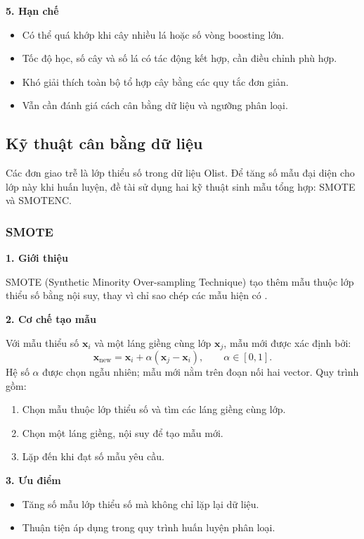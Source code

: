 \documentclass[a4paper]{article}
\begin{document}
\noindent\textbf{5. Hạn chế}\par
\begin{itemize}
    \item Có thể quá khớp khi cây nhiều lá hoặc số vòng boosting lớn.
    \item Tốc độ học, số cây và số lá có tác động kết hợp, cần điều chỉnh phù hợp.
    \item Khó giải thích toàn bộ tổ hợp cây bằng các quy tắc đơn giản.
    \item Vẫn cần đánh giá cách cân bằng dữ liệu và ngưỡng phân loại.
\end{itemize}



\subsection{Kỹ thuật cân bằng dữ liệu}
Các đơn giao trễ là lớp thiểu số trong dữ liệu Olist. Để tăng số mẫu đại diện cho lớp này khi huấn luyện, đề tài sử dụng hai kỹ thuật sinh mẫu tổng hợp: SMOTE và SMOTENC.

\subsubsection{SMOTE}
\noindent\textbf{1. Giới thiệu}\par
SMOTE (Synthetic Minority Over-sampling Technique) tạo thêm mẫu thuộc lớp thiểu số bằng nội suy, thay vì chỉ sao chép các mẫu hiện có \cite{smoteTheory}.

\noindent\textbf{2. Cơ chế tạo mẫu}\par
Với mẫu thiểu số $\mathbf{x}_i$ và một láng giềng cùng lớp $\mathbf{x}_j$, mẫu mới được xác định bởi:
\[
\mathbf{x}_{\mathrm{new}}=\mathbf{x}_i+\alpha(\mathbf{x}_j-\mathbf{x}_i),
\qquad \alpha\in[0,1].
\]
Hệ số $\alpha$ được chọn ngẫu nhiên; mẫu mới nằm trên đoạn nối hai vector. Quy trình gồm:
\begin{enumerate}
    \item Chọn mẫu thuộc lớp thiểu số và tìm các láng giềng cùng lớp.
    \item Chọn một láng giềng, nội suy để tạo mẫu mới.
    \item Lặp đến khi đạt số mẫu yêu cầu.
\end{enumerate}

\noindent\textbf{3. Ưu điểm}\par
\begin{itemize}
    \item Tăng số mẫu lớp thiểu số mà không chỉ lặp lại dữ liệu.
    \item Thuận tiện áp dụng trong quy trình huấn luyện phân loại.
\end{itemize}
\end{document}
